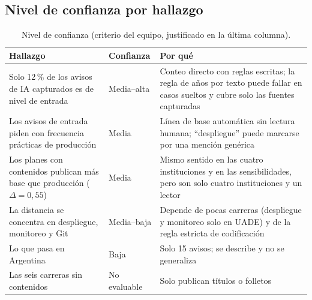 \documentclass[11pt,a4paper]{article}
\begin{document}
\subsection{Nivel de confianza por hallazgo}\label{sec:confianza}
\begin{table}[H]
\centering\small
\begin{tabularx}{\textwidth}{L{4.6cm} L{2.0cm} X}
\toprule
{}\textbf{Hallazgo} & \textbf{Confianza} & \textbf{Por qué}\\
\midrule
Solo 12\,\% de los avisos de IA capturados es de nivel de entrada & Media--alta & Conteo directo con reglas escritas; la regla de años por texto puede fallar en casos sueltos y cubre solo las fuentes capturadas\\
Los avisos de entrada piden con frecuencia prácticas de producción & Media & Línea de base automática sin lectura humana; ``despliegue'' puede marcarse por una mención genérica\\
Los planes con contenidos publican más base que producción ($\Delta = 0{,}55$) & Media & Mismo sentido en las cuatro instituciones y en las sensibilidades, pero son solo cuatro instituciones y un lector\\
La distancia se concentra en despliegue, monitoreo y Git & Media--baja & Depende de pocas carreras (despliegue y monitoreo solo en UADE) y de la regla estricta de codificación\\
Lo que pasa en Argentina & Baja & Solo 15 avisos; se describe y no se generaliza\\
Las seis carreras sin contenidos & No evaluable & Solo publican títulos o folletos\\
\bottomrule
\end{tabularx}
\caption{Nivel de confianza (criterio del equipo, justificado en la última columna).}
\end{table}
\end{document}
